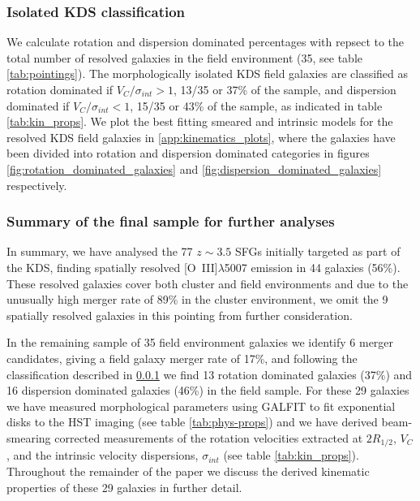 \documentclass[fleqn,usenatbib]{mn2e}
\begin{document}
\subsubsection{Isolated KDS classification}\label{subsubsection:isolated_classification}
We calculate rotation and dispersion dominated percentages with repsect to the total number of resolved galaxies in the field environment (35, see table \ref{tab:pointings}).
The morphologically isolated KDS field galaxies are classified as rotation dominated if $V_{C}/\sigma_{int} > 1$, 13/35 or 37\% of the sample, and dispersion dominated if $V_{C}/\sigma_{int} < 1$, 15/35 or 43\% of the sample, as indicated in table \ref{tab:kin_props}.
We plot the best fitting smeared and intrinsic models for the resolved KDS field galaxies in \cref{app:kinematics_plots}, where the galaxies have been divided into rotation and dispersion dominated categories in figures \ref{fig:rotation_dominated_galaxies} and \ref{fig:dispersion_dominated_galaxies} respectively.

\subsubsection{Summary of the final sample for further analyses}\label{subsubsec:kin_sample_summary}
In summary, we have analysed the 77 $z\sim3.5$ SFGs initially targeted as part of the KDS, finding spatially resolved [O~{\sc III}]$\lambda$5007 emission in 44 galaxies (56\%).
These resolved galaxies cover both cluster and field environments and due to the unusually high merger rate of 89\% in the cluster environment, we omit the 9 spatially resolved galaxies in this pointing from further consideration.

In the remaining sample of 35 field environment galaxies we identify 6 merger candidates, giving a field galaxy merger rate of 17\%, and following the classification described in \cref{subsubsection:isolated_classification} we find 13 rotation dominated galaxies (37\%) and 16 dispersion dominated galaxies (46\%) in the field sample.
For these 29 galaxies we have measured morphological parameters using GALFIT to fit exponential disks to the HST imaging (see table \ref{tab:phys-props}) and we have derived beam-smearing corrected measurements of the rotation velocities extracted at $2R_{1/2}$, $V_{C}$, and the intrinsic velocity dispersions, $\sigma_{int}$ (see table \ref{tab:kin_props}).
Throughout the remainder of the paper we discuss the derived kinematic properties of these 29 galaxies in further detail.
\end{document}
